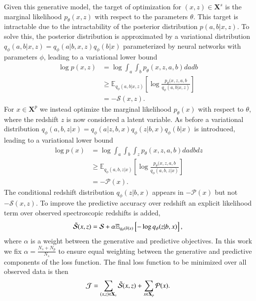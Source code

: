 Given this generative model, the target of optimization for $(x,z)\in \mathbf{X}^s$ is the marginal likelihood $p_\theta(x,z)$ with respect to the parameters $\theta$. This target is intractable due to the intractability of the posterior distribution $p(a,b|x,z)$. To solve this, the posterior distribution is approximated by a variational distribution $q_\phi(a,b|x,z)=q_\phi(a|b,x,z) q_\phi(b|x)$ parameterized by neural networks with parameters $\phi$, leading to a variational lower bound \cite{maaloeAuxiliaryDeepGenerative2016}
\begin{align}
    \log p(x,z) &= \log \int_a \int_b p_\theta (x,z,a,b) dadb \\
    &\geq \mathbb{E}_{q_\phi(a,b|x,z)} \left[ \log \frac{p_\theta(x,z,a,b}{q_\phi(a,b|x,z)} \right] \\
    &= -\mathcal{S}(x,z). \label{eq:spec_loss}
\end{align}
For $x \in \mathbf{X}^p$ we instead optimize the marginal likelihood $p_\theta(x)$ with respect to $\theta$, where the redshift $z$ is now considered a latent variable. As before a variational distribution $q_\phi(a,b,z|x)=q_\phi(a|z,b,x)q_\phi(z|b,x)q_\phi(b|x)$ is introduced, leading to a variational lower bound
\begin{align}
    \log p(x) &= \log \int_a \int_b \int_z p_\theta (x,z,a,b) dadbdz \\
    &\geq \mathbb{E}_{q_\phi(a,b,z|x)} \left[ \log \frac{p_\theta(x,z,a,b}{q_\phi(a,b,z|x)} \right] \\
    &= -\mathcal{P}(x). \label{eq:phot_loss}
\end{align}
The conditional redshift distribution $q_\phi(z|b,x)$ appears in $-\mathcal{P}(x)$ but not $-\mathcal{S}(x,z)$. To improve the predictive accuracy over redshift an explicit likelihood term over observed spectroscopic redshifts is added,
\begin{align}
    \Tilde{\mathcal{S}}(x,z) = \mathcal{S} + \alpha \mathbb{E}_{q_\phi(b|x)}\left[ -\log q_\phi(z|b,x) \right], \label{eq:predictive_loss}
\end{align}
where $\alpha$ is a weight between the generative and predictive objectives. In this work we fix $\alpha=\frac{N_s+N_p}{N_s}$ to ensure equal weighting between the generative and predictive components of the loss function. The final loss function to be minimized over all observed data is then
\begin{align}
    \mathcal{J} = \sum_{(x,z)\in\mathbf{X}_s} \Tilde{\mathcal{S}}(x,z) + \sum_{x\in\mathbf{X}_p} \mathcal{P}(x). \label{eq:loss}
\end{align}

